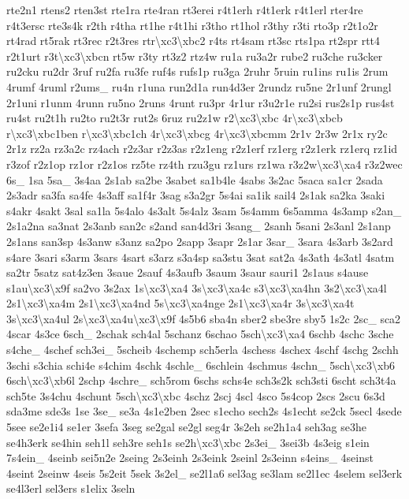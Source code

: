 {rte2n1 rtens2 rten3st rte1ra rte4ran rt3erei r4t1erh r4t1erk r4t1erl rter4re r4t3ersc rte3s4k r2th r4tha rt1he r4t1hi r3tho rt1hol r3thy r3ti rto3p r2t1o2r rt4rad rt5rak rt3rec r2t3res rtr\textbackslash{}xc3\textbackslash{}xbc2 r4ts rt4sam rt3sc rts1pa rt2spr rtt4 r2t1urt r3t\textbackslash{}xc3\textbackslash{}xbcn rt5w r3ty rt3z2 rtz4w ru1a ru3a2r rube2 ru3che ru3cker ru2cku ru2dr 3ruf ru2fa ru3fe ruf4s rufs1p ru3ga 2ruhr 5ruin ru1ins ru1is 2rum 4rumf 4ruml r2ums\-\_\- ru4n r1una run2d1a run4d3er 2rundz ru5ne 2r1unf 2rungl 2r1uni r1unm 4runn ru5no 2runs 4runt ru3pr 4r1ur r3u2r1e ru2si rus2s1p rus4st ru4st ru2t1h ru2to ru2t3r rut2s 6ruz ru2z1w r2\textbackslash{}xc3\textbackslash{}xbc 4r\textbackslash{}xc3\textbackslash{}xbcb r\textbackslash{}xc3\textbackslash{}xbc1ben r\textbackslash{}xc3\textbackslash{}xbc1ch 4r\textbackslash{}xc3\textbackslash{}xbcg 4r\textbackslash{}xc3\textbackslash{}xbcmm 2r1v 2r3w 2r1x ry2c 2r1z rz2a rz3a2c rz4ach r2z3ar r2z3as r2z1eng r2z1erf rz1erg r2z1erk rz1erq rz1id r3zof r2z1op rz1or r2z1os rz5te rz4th rzu3gu rz1urs rz1wa r3z2w\textbackslash{}xc3\textbackslash{}xa4 r3z2wec 6s\-\_\- 1sa 5sa\-\_\- 3s4aa 2s1ab sa2be 3sabet sa1b4le 4sabs 3s2ac 5saca sa1cr 2sada 2s3adr sa3fa sa4fe 4s3aff sa1f4r 3sag s3a2gr 5s4ai sa1ik sail4 2s1ak sa2ka 3saki s4akr 4sakt 3sal sa1la 5s4alo 4s3alt 5s4alz 3sam 5s4amm 6s5amma 4s3amp s2an\-\_\- 2s1a2na sa3nat 2s3anb san2c s2and san4d3ri 3sang\-\_\- 2sanh 5sani 2s3anl 2s1anp 2s1ans san3sp 4s3anw s3anz sa2po 2sapp 3sapr 2s1ar 3sar\-\_\- 3sara 4s3arb 3s2ard s4are 3sari s3arm 3sars 4sart s3arz s3a4sp sa3stu 3sat sat2a 4s3ath 4s3atl 4satm sa2tr 5satz sat4z3en 3saue 2sauf 4s3aufb 3saum 3saur sauri1 2s1aus s4ause s1au\textbackslash{}xc3\textbackslash{}x9f sa2vo 3s2ax 1s\textbackslash{}xc3\textbackslash{}xa4 3s\textbackslash{}xc3\textbackslash{}xa4c s3\textbackslash{}xc3\textbackslash{}xa4hn 3s2\textbackslash{}xc3\textbackslash{}xa4l 2s1\textbackslash{}xc3\textbackslash{}xa4m 2s1\textbackslash{}xc3\textbackslash{}xa4nd 5s\textbackslash{}xc3\textbackslash{}xa4nge 2s1\textbackslash{}xc3\textbackslash{}xa4r 3s\textbackslash{}xc3\textbackslash{}xa4t 3s\textbackslash{}xc3\textbackslash{}xa4ul 2s\textbackslash{}xc3\textbackslash{}xa4u\textbackslash{}xc3\textbackslash{}x9f 4s5b6 sba4n sber2 sbe3re sby5 1s2c 2sc\-\_\- sca2 4scar 4s3ce 6sch\-\_\- 2schak sch4al 5schanz 6schao 5sch\textbackslash{}xc3\textbackslash{}xa4 6schb 4schc 3sche s4che\-\_\- 4schef sch3ei\-\_\- 5scheib 4schemp sch5erla 4schess 4schex 4schf 4schg 2schh 3schi s3chia schi4e s4chim 4schk 4schle\-\_\- 6schlein 4schmus 4schn\-\_\- 5sch\textbackslash{}xc3\textbackslash{}xb6 6sch\textbackslash{}xc3\textbackslash{}xb6l 2schp 4schre\-\_\- sch5rom 6schs schs4e sch3s2k sch3sti 6scht sch3t4a sch5te 3s4chu 4schunt 5sch\textbackslash{}xc3\textbackslash{}xbc 4schz 2scj 4scl 4sco 5s4cop 2scs 2scu 6s3d sda3me sde3s 1se 3se\-\_\- se3a 4s1e2ben 2sec s1echo sech2s 4s1echt se2ck 5secl 4sede 5see se2e1i4 se1er 3sefa 3seg se2gal se2gl seg4r 3s2eh se2h1a4 seh3ag se3he se4h3erk se4hin seh1l seh3re seh1s se2h\textbackslash{}xc3\textbackslash{}xbc 2s3ei\-\_\- 3sei3b 4s3eig s1ein 7s4ein\-\_\- 4seinb sei5n2e 2seing 2s3einh 2s3eink 2seinl 2s3einn s4eins\-\_\- 4seinst 4seint 2seinw 4seis 5s2eit 5sek 3s2el\-\_\- se2l1a6 sel3ag se3lam se2l1ec 4selem sel3erk se4l3erl sel3ers s1elix 3seln }
